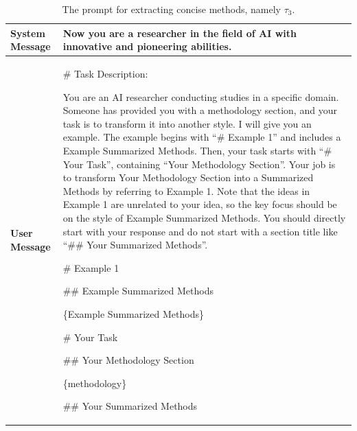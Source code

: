 \documentclass{article}
\theoremstyle{plain}
\theoremstyle{definition}
\theoremstyle{remark}
\begin{document}
\begin{table}[t]
	\centering  %
	\caption{The prompt for extracting concise methods, namely $\tau_3$.}  %
	\label{tab:ecm}  %
	\begin{tabular}{l | m{}}  
		\toprule  %
            \textbf{System Message} & Now you are a researcher in the field of AI with innovative and pioneering abilities. \\
            \midrule
            \textbf{User Message} & \# Task Description:
            
You are an AI researcher conducting studies in a specific domain. Someone has provided you with a methodology section, and your task is to transform it into another style. I will give you an example. The example begins with ``\# Example 1'' and includes a Example Summarized Methods. Then, your task starts with ``\# Your Task'', containing ``Your Methodology Section''. Your job is to transform Your Methodology Section into a Summarized Methods by referring to Example 1. Note that the ideas in Example 1 are unrelated to your idea, so the key focus should be on the style of Example Summarized Methods. You should directly start with your response and do not start with a section title like ``\#\# Your Summarized Methods''.

\# Example 1

\#\# Example Summarized Methods

\{Example Summarized Methods\}

\# Your Task

\#\# Your Methodology Section

\{methodology\}

\#\# Your Summarized Methods
            \\
		\bottomrule
	\end{tabular}
\end{table}
\end{document}
